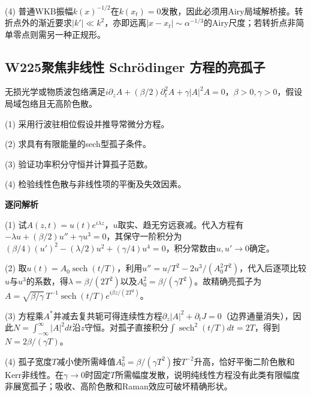 (4) 普通WKB振幅$k(x)^{-1/2}$在$k(x_t)=0$发散，因此必须用Airy局域解桥接。转折点外的渐近要求$|k'|\ll k^2$，亦即远离$|x-x_t|\sim\alpha^{-1/3}$的Airy尺度；若转折点非简单零点则需另一种正规形。

\par\medskip

\subsection*{W225\quad 聚焦非线性 Schrödinger 方程的亮孤子}

无损光学或物质波包络满足$i\partial_zA+(\beta/2)\partial_t^2A+\gamma|A|^2A=0$，$\beta>0,\gamma>0$，假设局域包络且无高阶色散。

(1) 采用行波驻相位假设并推导常微分方程。

(2) 求具有有限能量的sech型孤子条件。

(3) 验证功率积分守恒并计算孤子范数。

(4) 检验线性色散与非线性项的平衡及失效因素。

\par\textbf{逐问解析}

(1) 试$A(z,t)=u(t)e^{i\lambda z}$，$u$取实、趋无穷远衰减。代入方程有$-\lambda u+(\beta/2)u''+\gamma u^3=0$，其保守一阶积分为$(\beta/4)(u')^2-(\lambda/2)u^2+(\gamma/4)u^4=0$，积分常数由$u,u'\to0$确定。

(2) 取$u(t)=A_0\operatorname{sech}(t/T)$，利用$u''=u/T^2-2u^3/(A_0^2T^2)$，代入后逐项比较$u$与$u^3$的系数，得$\lambda=\beta/(2T^2)$以及$A_0^2=\beta/(\gamma T^2)$。故精确亮孤子为$A=\sqrt{\beta/\gamma}\,T^{-1}\operatorname{sech}(t/T)e^{i\beta z/(2T^2)}$。

(3) 方程乘$A^*$并减去复共轭可得连续性方程$\partial_z|A|^2+\partial_tJ=0$（边界通量消失），因此$N=\int_{-\infty}^{\infty}|A|^2dt$沿$z$守恒。对孤子直接积分$\int\operatorname{sech}^2(t/T)dt=2T$，得到$N=2\beta/(\gamma T)$。

(4) 孤子宽度$T$减小使所需峰值$A_0^2=\beta/(\gamma T^2)$按$T^{-2}$升高，恰好平衡二阶色散和Kerr非线性。在$\gamma\to0$时固定$T$所需幅度发散，说明纯线性方程没有此类有限幅度非展宽孤子；吸收、高阶色散和Raman效应可破坏精确形状。

\par\medskip
